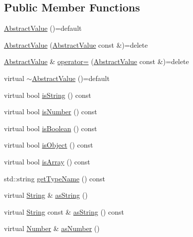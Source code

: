 \subsection*{Public Member Functions}
\begin{DoxyCompactItemize}
\item 
\hyperlink{classj_1_1impl_1_1_abstract_value_afb1c372ec9e3d7bca148232bdded5f53}{Abstract\-Value} ()=default
\item 
\hyperlink{classj_1_1impl_1_1_abstract_value_abf71e5a1649fb665a962fd4233e0b2a1}{Abstract\-Value} (\hyperlink{classj_1_1impl_1_1_abstract_value}{Abstract\-Value} const \&)=delete
\item 
\hyperlink{classj_1_1impl_1_1_abstract_value}{Abstract\-Value} \& \hyperlink{classj_1_1impl_1_1_abstract_value_a17f2d4e648e692ff1990ef7094ed9c1f}{operator=} (\hyperlink{classj_1_1impl_1_1_abstract_value}{Abstract\-Value} const \&)=delete
\item 
virtual \hyperlink{classj_1_1impl_1_1_abstract_value_a6980a016e15879d8b3eed45d0f1c10bb}{$\sim$\-Abstract\-Value} ()=default
\item 
virtual bool \hyperlink{classj_1_1impl_1_1_abstract_value_ac931756f6157e90b6f824fb4ae9e6ee2}{is\-String} () const 
\item 
virtual bool \hyperlink{classj_1_1impl_1_1_abstract_value_aab7be0e32dc9a488a9597d1fad5e84f5}{is\-Number} () const 
\item 
virtual bool \hyperlink{classj_1_1impl_1_1_abstract_value_a057ddc8b2d01c7a93b998cf1fab01cdd}{is\-Boolean} () const 
\item 
virtual bool \hyperlink{classj_1_1impl_1_1_abstract_value_a62b0b78a969ba3d8ea426e46c96c2517}{is\-Object} () const 
\item 
virtual bool \hyperlink{classj_1_1impl_1_1_abstract_value_a28a367d6f2bfa668c420cc587b6daaf9}{is\-Array} () const 
\item 
std\-::string \hyperlink{classj_1_1impl_1_1_abstract_value_a64dbe0d7a865b910d5baba01d88125ae}{get\-Type\-Name} () const 
\item 
virtual \hyperlink{classj_1_1impl_1_1_string}{String} \& \hyperlink{classj_1_1impl_1_1_abstract_value_a7bbc123a13e953d51789f65d8e974aa1}{as\-String} ()
\item 
virtual \hyperlink{classj_1_1impl_1_1_string}{String} const \& \hyperlink{classj_1_1impl_1_1_abstract_value_a93ea458da59b4a9cab2cc7c359792105}{as\-String} () const 
\item 
virtual \hyperlink{classj_1_1impl_1_1_number}{Number} \& \hyperlink{classj_1_1impl_1_1_abstract_value_a12d6d18e7b575da29ba587865ba06a9c}{as\-Number} ()

\end{DoxyCompactItemize}
